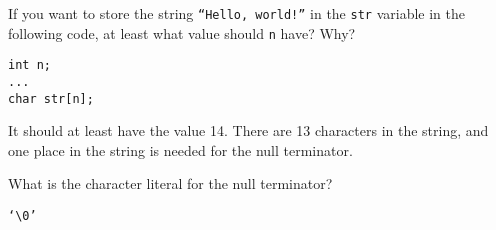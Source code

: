 If you want to store the string \texttt{``Hello, world!''} in the \texttt{str} variable in the following code, at least what value should \texttt{n} have? Why?
\begin{lstlisting}
int n;
...
char str[n];
\end{lstlisting}

\begin{answer}
It should at least have the value 14.
There are 13 characters in the string, and one place in the string is needed for the null terminator.
\end{answer}

\item What is the character literal for the null terminator?

\begin{answer}
\texttt{`\textbackslash0'}
\end{answer}
